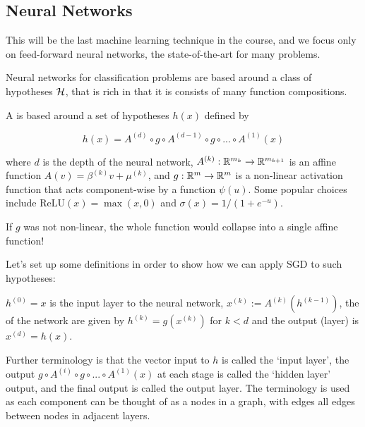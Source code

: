 \documentclass[11pt]{scrartcl}
\begin{document}
\subsection{Neural Networks}

This will be the last machine learning technique in the course, and we focus only on feed-forward neural networks, the state-of-the-art for many problems.

Neural networks for classification problems are based around a class of hypotheses $\mathcal{H}$, that is rich in that it is consists of many function compositions.

\begin{definition}
A  is based around a set of hypotheses $h(x)$ defined by 

\begin{equation}
    h(x) = A^{(d)} \circ g \circ A^{(d-1)} \circ g \circ ... \circ A^{(1)}(x)
\end{equation}

where $d$ is the depth of the neural network, $A^{(k)} : \mathbb R^{m_k} \rightarrow \mathbb R^{m_{k+1}}$ is an affine function $A(v) = \beta^{(k)} v + \mu^{(k)}$, and $g : \mathbb R^m \rightarrow \mathbb R^m$ is a non-linear activation function that acts component-wise by a function $\psi(u)$. Some popular choices include $\text{ReLU}(x) = \max(x,0)$ and $\sigma(x) = 1/(1+e^{-u})$. %
\end{definition}

\begin{remark}
If $g$ was not non-linear, the whole function would collapse into a single affine function!
\end{remark}

Let's set up some definitions in order to show how we can apply SGD to such hypotheses:

\begin{definition}
$h^{(0)} = x$ is the input layer to the neural network, $x^{(k)} := A^{(k)}(h^{(k-1)})$, the  of the network are given by $h^{(k)} = g(x^{(k)})$ for $k<d$ and the output (layer) is $x^{(d)} = h(x)$.
\end{definition}

Further terminology is that the vector input to $h$ is called the `input layer', the output $g \circ A^{(i)} \circ g \circ ... \circ A^{(1)}(x)$ at each stage is called the `hidden layer' output, and the final output is called the output layer. The terminology is used as each component can be thought of as a nodes in a graph, with edges all edges between nodes in adjacent layers.
\end{document}
